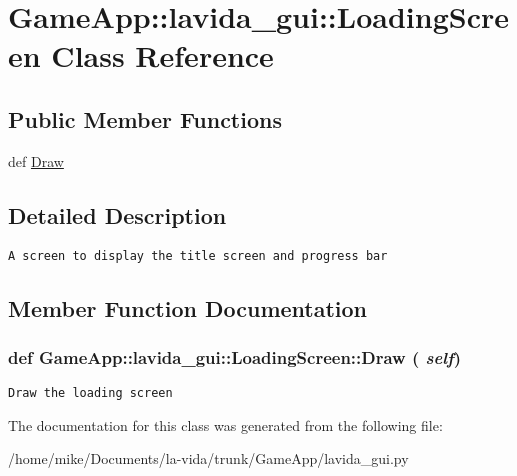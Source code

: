 \hypertarget{classGameApp_1_1lavida__gui_1_1LoadingScreen}{
\section{GameApp::lavida\_\-gui::LoadingScreen Class Reference}
\label{classGameApp_1_1lavida__gui_1_1LoadingScreen}
}
\subsection*{Public Member Functions}
\begin{CompactItemize}
\item 
def \hyperlink{classGameApp_1_1lavida__gui_1_1LoadingScreen_20d28b20375d5d37a72930438d85bf23}{Draw}
\end{CompactItemize}


\subsection{Detailed Description}


\footnotesize\begin{verbatim}A screen to display the title screen and progress bar\end{verbatim}
\normalsize
 

\subsection{Member Function Documentation}
\hypertarget{classGameApp_1_1lavida__gui_1_1LoadingScreen_20d28b20375d5d37a72930438d85bf23}{
\subsubsection[Draw]{\setlength{\rightskip}{0pt plus 5cm}def GameApp::lavida\_\-gui::LoadingScreen::Draw ( {\em self})}}
\label{classGameApp_1_1lavida__gui_1_1LoadingScreen_20d28b20375d5d37a72930438d85bf23}




\footnotesize\begin{verbatim}Draw the loading screen\end{verbatim}
\normalsize
 

The documentation for this class was generated from the following file:\begin{CompactItemize}
\item 
/home/mike/Documents/la-vida/trunk/GameApp/lavida\_\-gui.py\end{CompactItemize}
